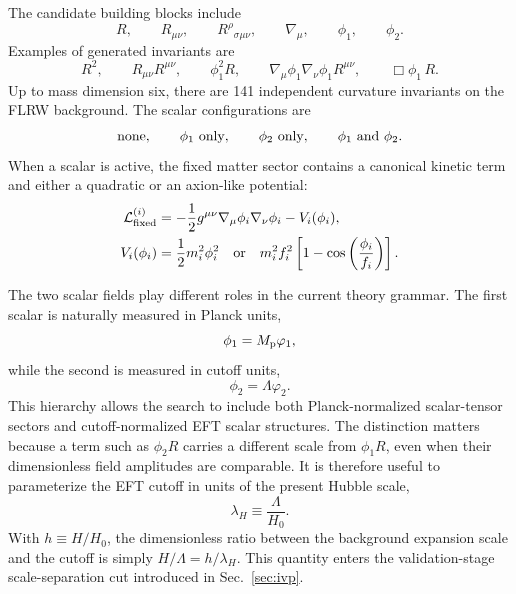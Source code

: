 \documentclass[aps,prd,twocolumn,superscriptaddress,nofootinbib,longbibliography]{revtex4-2}
\newcommand{\Lag}{\mathcal{L}}
\newcommand{\Mp}{M_{\rm p}}
\newcommand{\Lam}{\Lambda}
\newcommand{\varphione}{\varphi_1}
\newcommand{\varphitwo}{\varphi_2}
\begin{document}
The candidate building blocks include
\begin{equation}
R,\qquad R_{\mu\nu},\qquad R^\rho{}_{\sigma\mu\nu},\qquad
\nabla_\mu,\qquad \phi_1,\qquad \phi_2 .
\end{equation}
Examples of generated invariants are
\begin{equation}
R^2,\qquad
R_{\mu\nu}R^{\mu\nu},\qquad
\phi_1^2R,\qquad
\nabla_\mu\phi_1\nabla_\nu\phi_1R^{\mu\nu},\qquad
\Box\phi_1\,R.
\end{equation}
Up to mass dimension six, there are 141 independent curvature invariants on the FLRW background.
The scalar configurations are 
\begin{equation}
\hbox{none},\qquad \phi_1\hbox{ only},\qquad \phi_2\hbox{ only},\qquad \phi_1\text{ and }\phi_2 .
\end{equation}
When a scalar is active, the fixed matter sector contains a canonical kinetic term and either a quadratic or an axion-like potential:
\begin{align}
\Lag_{\rm fixed}^{(i)}
&=-\frac12 g^{\mu\nu}\nabla_\mu\phi_i\nabla_\nu\phi_i - V_i(\phi_i),\\
V_i(\phi_i)
&=\frac12 m_i^2\phi_i^2
\quad{\rm or}\quad
m_i^2f_i^2\left[1-\cos\left(\frac{\phi_i}{f_i}\right)\right].
\label{eq:fixed-sector}
\end{align}


The two scalar fields play different roles in the current theory grammar.  The first scalar is naturally measured in Planck units,
\begin{equation}
\phi_1=\Mp\varphione,
\end{equation}
while the second is measured in cutoff units,
\begin{equation}
\phi_2=\Lam\varphitwo .
\end{equation}
This hierarchy allows the search to include both Planck-normalized scalar-tensor sectors and cutoff-normalized EFT scalar structures.  The distinction matters because a term such as $\phi_2 R$ carries a different scale from $\phi_1 R$, even when their dimensionless field amplitudes are comparable.  It is therefore useful to parameterize the EFT cutoff in units of the present Hubble scale,
\begin{equation}
\lambda_H\equiv\frac{\Lam}{H_0}.
\label{eq:lambdaH}
\end{equation}
With $h\equiv H/H_0$, the dimensionless ratio between the background expansion scale and the cutoff is simply $H/\Lam=h/\lambda_H$.  This quantity enters the validation-stage scale-separation cut introduced in Sec.~\ref{sec:ivp}.
\end{document}
